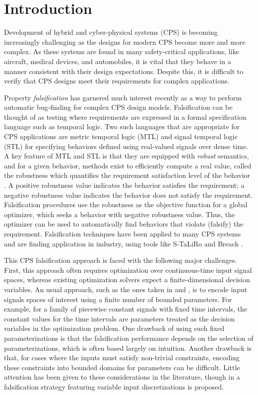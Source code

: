 \section{Introduction} \label{sec:introduction}

Development of hybrid and cyber-physical systems (CPS) is becoming
increasingly challenging as the designs for modern CPS become more and
more complex.  As these systems are found in many safety-critical
applications, like aircraft, medical devices, and automobiles, it is
vital that they behave in a manner consistent with their
design expectations. Despite this, it is difficult to verify that CPS
designs meet their requirements for complex applications.

Property \emph{falsification} has garnered much interest recently as a
way to perform automatic bug-finding for complex CPS design
models. Falsification can be thought of as testing where requirements
are expressed in a formal specification language such as temporal
logic.  Two such languages that are appropriate for CPS applications
are metric temporal logic (MTL) and signal temporal logic (STL)
\cite{Koymans1990,MalerN04} for specifying behaviors defined using
real-valued signals over dense time. A key feature of MTL and STL is
that they are equipped with \emph{robust} semantics, and for a given
behavior, methods exist to efficiently compute a real value, called
the robustness which quantifies the requirement satisfaction level of
the behavior \cite{FainekosP06fates,DonzeM10}. A positive robustness
value indicates the behavior satisfies the requirement; a negative
robustness value indicates the behavior does not satisfy the
requirement. Falsification procedures use the robustness as the
objective function for a global optimizer, which seeks a behavior with
negative robustness value. Thus, the optimizer can be used to
automatically find behaviors that violate (falsify) the
requirement. Falsification techniques have been applied to many CPS
systems and are finding application in industry, using tools like
S-TaLiRo and Breach \cite{TaliroLFS11,BreachCAV10}.

This CPS falsification approach is faced with the following major
challenges.  First, this approach often requires optimization over
continuous-time input signal spaces, whereas existing optimization
solvers expect a finite-dimensional decision variables.  An usual
approach, such as the ones taken in \cite{BreachCAV10} and
\cite{Nghiem10}, is to encode input signals spaces of interest using a
finite number of bounded parameters. For example, for a family of
piecewise constant signals with fixed time intervals, the constant
values for the time intervals are parameters treated as the decision
variables in the optimization problem. One drawback of using such
fixed parameterizations is that the falsification performance depends
on the selection of parameterizations, which is often based largely on
intuition. Another drawback is that, for cases where the inputs must
satisfy non-trivial constraints, encoding these constraints into
bounded domains for parameters can be difficult. Little attention has
been given to these considerations in the literature, though in
\cite{DBLP:conf/atva/DeshmukhJKM15} a falsification strategy featuring
variable input discretizations is proposed.

